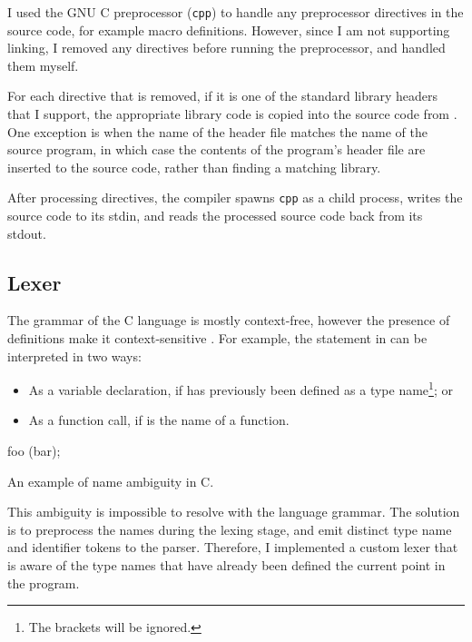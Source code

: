\documentclass[00-main.tex]{subfiles}
\begin{document}
I used the GNU C preprocessor (\texttt{cpp})  to handle any preprocessor directives in the source code, for example macro definitions.
However, since I am not supporting linking, I removed any  directives before running the preprocessor, and handled them myself.

For each  directive that is removed, if it is one of the standard library headers that I support, the appropriate library code is copied into the source code from .
One exception is when the name of the header file matches the name of the source program, in which case the contents of the program's header file are inserted to the source code, rather than finding a matching library.

After processing  directives, the compiler spawns \texttt{cpp} as a child process, writes the source code to its stdin, and reads the processed source code back from its stdout.

\subsection{Lexer}

The grammar of the C language is mostly context-free, however the presence of  definitions make it context-sensitive .
For example, the statement in  can be interpreted in two ways:
\begin{itemize}
\item As a variable declaration, if  has previously been defined as a type name\footnote{The brackets will be ignored.}; or
\item As a function call, if  is the name of a function.
\end{itemize}

\begin{listing}[H]
  \begin{CListing}
  foo (bar);
  \end{CListing}
  \caption{An example of  name ambiguity in C.}
  \label{lst:typedef name ambiguity example}
\end{listing}

This ambiguity is impossible to resolve with the language grammar. The solution is to preprocess the  names during the lexing stage, and emit distinct type name and identifier tokens to the parser.
Therefore, I implemented a custom lexer that is aware of the type names that have already been defined the current point in the program.
\end{document}
